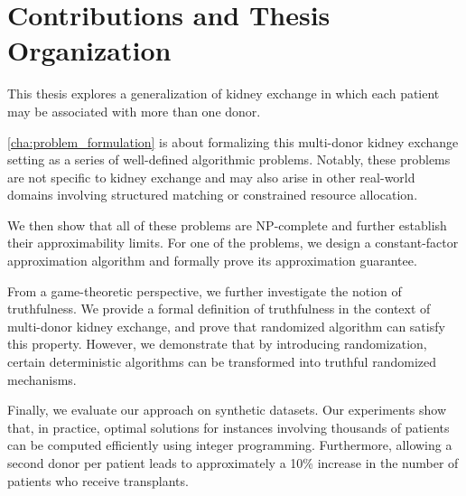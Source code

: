 \section{Contributions and Thesis Organization}

This thesis explores a generalization of kidney exchange in which each patient may be associated with more than one donor.

\autoref{cha:problem_formulation} is about formalizing this multi-donor kidney exchange setting as a series of well-defined algorithmic problems. Notably, these problems are not specific to kidney exchange and may also arise in other real-world domains involving structured matching or constrained resource allocation.

We then show that all of these problems are NP-complete and further establish their approximability limits. For one of the problems, we design a constant-factor approximation algorithm and formally prove its approximation guarantee.

From a game-theoretic perspective, we further investigate the notion of truthfulness. We provide a formal definition of truthfulness in the context of multi-donor kidney exchange, and prove that randomized algorithm can satisfy this property. However, we demonstrate that by introducing randomization, certain deterministic algorithms can be transformed into truthful randomized mechanisms.

Finally, we evaluate our approach on synthetic datasets. Our experiments show that, in practice, optimal solutions for instances involving thousands of patients can be computed efficiently using integer programming. Furthermore, allowing a second donor per patient leads to approximately a 10\% increase in the number of patients who receive transplants.



